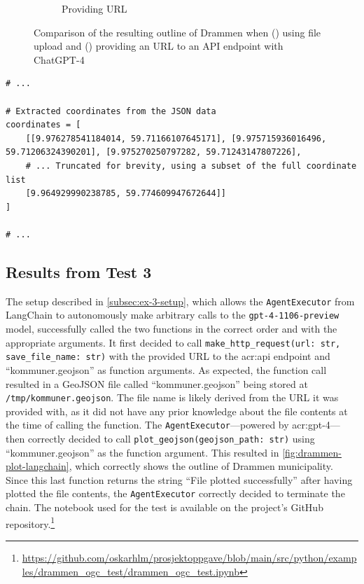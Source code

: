 \begin{figure}
\begin{subfigure}{0.45\textwidth}
        \caption{Providing URL}
        \label{subfig:drammen-outline-api}
    \end{subfigure}
    \caption{Comparison of the resulting outline of Drammen when () using file upload and () providing an URL to an API endpoint with ChatGPT-4}
    \label{fig:file-upload-api-comparison}
\end{figure}

\begin{minipage}{\linewidth}
    \begin{lstlisting}[style=python, caption=ChatGPT code that truncates coordinates, label=lst:python-for-failed-drammen-outline]
# ...

# Extracted coordinates from the JSON data
coordinates = [
    [[9.976278541184014, 59.71166107645171], [9.975715936016496, 59.71206324390201], [9.975270250797282, 59.71243147807226], 
    # ... Truncated for brevity, using a subset of the full coordinate list
    [9.964929990238785, 59.774609947672644]]
]

# ...
\end{lstlisting}
\end{minipage}

\subsection{Results from Test 3}\label{subsec:experiment-3-results}

The setup described in \autoref{subsec:ex-3-setup}, which allows the \texttt{AgentExecutor} from LangChain to autonomously make arbitrary calls to the \texttt{gpt-4-1106-preview} model, successfully called the two functions in the correct order and with the appropriate arguments. It first decided to call \texttt{make\_http\_request(url: str, save\_file\_name: str)} with the provided URL to the \acrshort{acr:api} endpoint and \enquote{kommuner.geojson} as function arguments. As expected, the function call resulted in a GeoJSON file called \enquote{kommuner.geojson} being stored at \texttt{/tmp/kommuner.geojson}. The file name is likely derived from the URL it was provided with, as it did not have any prior knowledge about the file contents at the time of calling the function. The \texttt{AgentExecutor}---powered by \acrshort{acr:gpt}-4---then correctly decided to call \texttt{plot\_geojson(geojson\_path: str)} using \enquote{kommuner.geojson} as the function argument. This resulted in \autoref{fig:drammen-plot-langchain}, which correctly shows the outline of Drammen municipality. Since this last function returns the string \enquote{File plotted successfully} after having plotted the file contents, the \texttt{AgentExecutor} correctly decided to terminate the chain. The notebook used for the test is available on the project's GitHub repository.\footnote{\url{https://github.com/oskarhlm/prosjektoppgave/blob/main/src/python/examples/drammen_ogc_test/drammen_ogc_test.ipynb}}

